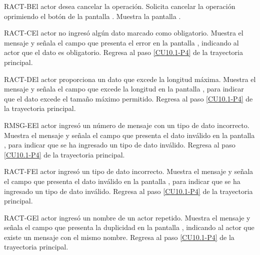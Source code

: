 	\begin{UCtrayectoriaA}{RACT-B}{El actor desea cancelar la operación.}
		\UCpaso[\UCactor] Solicita cancelar la operación oprimiendo el botón  de la pantalla .
		\UCpaso[\UCsist] Muestra la pantalla .
	\end{UCtrayectoriaA}

	\begin{UCtrayectoriaA}{RACT-C}{El actor no ingresó algún dato marcado como obligatorio.}
		\UCpaso[\UCsist] Muestra el mensaje  y señala el campo que presenta el error en la pantalla , indicando al actor que el dato es obligatorio.
		\UCpaso Regresa al paso \ref{CU10.1-P4} de la trayectoria principal.
	\end{UCtrayectoriaA}

	\begin{UCtrayectoriaA}{RACT-D}{El actor proporciona un dato que excede la longitud máxima.}
		\UCpaso[\UCsist] Muestra el mensaje  y señala el campo que excede la longitud en la pantalla , para indicar que el dato excede el tamaño máximo permitido.
		\UCpaso Regresa al paso \ref{CU10.1-P4} de la trayectoria principal.
	\end{UCtrayectoriaA}

	\begin{UCtrayectoriaA}{RMSG-E}{El actor ingresó un número de mensaje con un tipo de dato incorrecto.}
		\UCpaso[\UCsist] Muestra el mensaje  y señala el campo que presenta el dato inválido en la pantalla , para indicar que se ha ingresado un tipo de dato inválido.
		\UCpaso Regresa al paso \ref{CU10.1-P4} de la trayectoria principal.
	\end{UCtrayectoriaA}

	\begin{UCtrayectoriaA}{RACT-F}{El actor ingresó un tipo de dato incorrecto.}
		\UCpaso[\UCsist] Muestra el mensaje  y señala el campo que presenta el dato inválido en la pantalla , para indicar que se ha ingresado un tipo de dato inválido.
		\UCpaso Regresa al paso \ref{CU10.1-P4} de la trayectoria principal.
	\end{UCtrayectoriaA}
	
	\begin{UCtrayectoriaA}{RACT-G}{El actor ingresó un nombre de un actor repetido.}
		\UCpaso[\UCsist] Muestra el mensaje  y señala el campo que presenta la duplicidad en la pantalla , indicando al actor que existe un mensaje con el mismo nombre.
		\UCpaso Regresa al paso \ref{CU10.1-P4} de la trayectoria principal.
	\end{UCtrayectoriaA}
